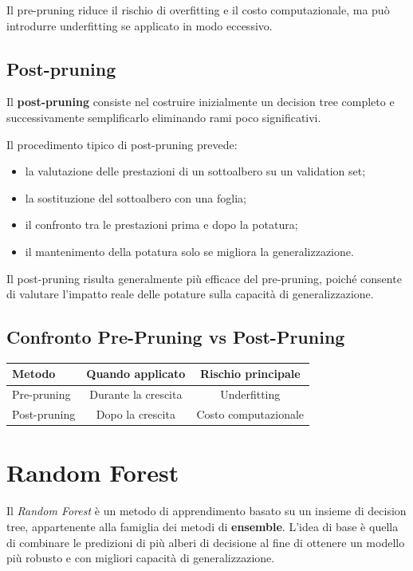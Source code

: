 \documentclass[a4paper,12pt]{report}
\begin{document}
Il pre-pruning riduce il rischio di overfitting e il costo computazionale, ma può introdurre underfitting se applicato in modo eccessivo.

\subsection{Post-pruning}

Il \textbf{post-pruning} consiste nel costruire inizialmente un decision tree completo e successivamente semplificarlo eliminando rami poco significativi.

Il procedimento tipico di post-pruning prevede:
\begin{itemize}
    \item la valutazione delle prestazioni di un sottoalbero su un validation set;
    \item la sostituzione del sottoalbero con una foglia;
    \item il confronto tra le prestazioni prima e dopo la potatura;
    \item il mantenimento della potatura solo se migliora la generalizzazione.
\end{itemize}

Il post-pruning risulta generalmente più efficace del pre-pruning, poiché consente di valutare l’impatto reale delle potature sulla capacità di generalizzazione.

\subsection*{Confronto Pre-Pruning vs Post-Pruning}

\begin{center}
\begin{tabular}{l|c|c}
\textbf{Metodo} & \textbf{Quando applicato} & \textbf{Rischio principale} \\
\hline
Pre-pruning & Durante la crescita & Underfitting \\
Post-pruning & Dopo la crescita & Costo computazionale \\
\end{tabular}
\end{center}


\section{Random Forest}

Il \textit{Random Forest} è un metodo di apprendimento basato su un insieme di decision tree, appartenente alla famiglia dei metodi di \textbf{ensemble}.
L’idea di base è quella di combinare le predizioni di più alberi di decisione al fine di ottenere un modello più robusto e con migliori capacità di generalizzazione.
\end{document}
